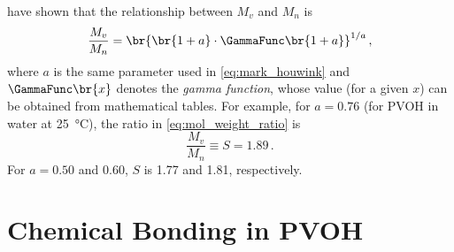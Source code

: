 \textcite{schaefgen48} have shown that the relationship between \( M_v \) and \( M_n \) is
\begin{equation}
	\frac{M_v}{M_n} = \br{\br{1 + a} \cdot \GammaFunc\br{1 + a}}^{1/a} \, ,
	\label{eq:mol_weight_ratio}
\end{equation}
where \( a \) is the same parameter used in \cref{eq:mark_houwink} and \( \GammaFunc\br{x} \) denotes the \emph{gamma function}, whose value (for a given \( x \)) can be obtained from mathematical tables. 
For example, for \( a = 0.76 \) (for PVOH in water at \qty{25}{\celsius}),\autocite{flory48} the ratio in \cref{eq:mol_weight_ratio} is 
\begin{equation}
	\frac{M_v}{M_n} \equiv S = 1.89 \, .
	\label{eq:mol_weight_ratio_ex}
\end{equation}
For \( a = 0.50 \) and \num{0.60}, \( S \) is \num{1.77} and \num{1.81}, respectively. 


\section{Chemical Bonding in PVOH} %
\label{sec:chemical_bonding_in_pvoh}

